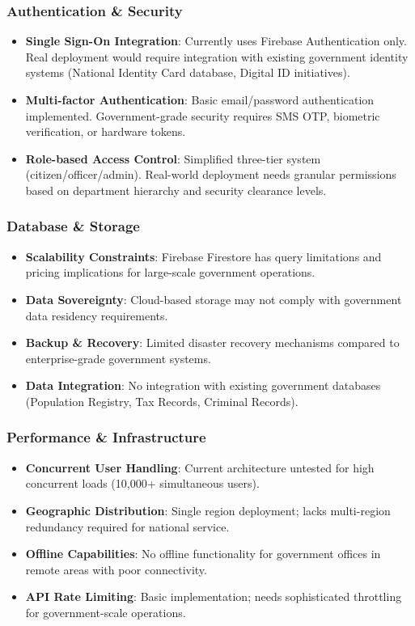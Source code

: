 \documentclass[12pt,a4paper]{article}
\begin{document}
\subsubsection{Authentication \& Security}
\begin{itemize}[leftmargin=*]
    \item \textbf{Single Sign-On Integration}: Currently uses Firebase Authentication only. Real deployment would require integration with existing government identity systems (National Identity Card database, Digital ID initiatives).
    \item \textbf{Multi-factor Authentication}: Basic email/password authentication implemented. Government-grade security requires SMS OTP, biometric verification, or hardware tokens.
    \item \textbf{Role-based Access Control}: Simplified three-tier system (citizen/officer/admin). Real-world deployment needs granular permissions based on department hierarchy and security clearance levels.
\end{itemize}

\subsubsection{Database \& Storage}
\begin{itemize}[leftmargin=*]
    \item \textbf{Scalability Constraints}: Firebase Firestore has query limitations and pricing implications for large-scale government operations.
    \item \textbf{Data Sovereignty}: Cloud-based storage may not comply with government data residency requirements.
    \item \textbf{Backup \& Recovery}: Limited disaster recovery mechanisms compared to enterprise-grade government systems.
    \item \textbf{Data Integration}: No integration with existing government databases (Population Registry, Tax Records, Criminal Records).
\end{itemize}

\subsubsection{Performance \& Infrastructure}
\begin{itemize}[leftmargin=*]
    \item \textbf{Concurrent User Handling}: Current architecture untested for high concurrent loads (10,000+ simultaneous users).
    \item \textbf{Geographic Distribution}: Single region deployment; lacks multi-region redundancy required for national service.
    \item \textbf{Offline Capabilities}: No offline functionality for government offices in remote areas with poor connectivity.
    \item \textbf{API Rate Limiting}: Basic implementation; needs sophisticated throttling for government-scale operations.
\end{itemize}
\end{document}
